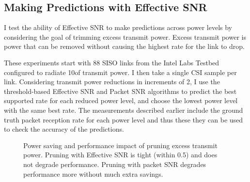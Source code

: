 \subsection{Making Predictions with Effective SNR}
I test the ability of Effective SNR to make predictions across power levels by considering the goal of trimming excess transmit power. Excess transmit power is power that can be removed without causing the highest rate for the link to drop.

These experiments start with 88 SISO links from the Intel Labs Testbed configured to radiate 10\mW of transmit power. I then take a single CSI sample per link. Considering transmit power reductions in increments of 2\dB, I use the threshold-based Effective SNR and Packet SNR algorithms to predict the best supported rate for each reduced power level, and choose the lowest power level with the same best rate. The measurements described earlier include the ground truth packet reception rate for each power level and thus these they can be used to check the accuracy of the predictions.

\begin{figure}[t]
      \centering
      \caption[Impact of pruning excess transmit power]{\label{fig:power_save_1x1} Power saving and performance impact of pruning excess transmit power. Pruning with Effective SNR is tight (within 0.5\dB) and does not degrade performance. Pruning with packet SNR degrades performance more without much extra savings.} 
\end{figure}


